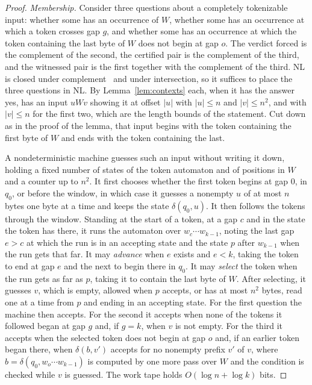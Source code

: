 \documentclass[11pt,a4paper]{article}
\theoremstyle{definition}
\theoremstyle{plain}
\begin{document}
\begin{proof}
\emph{Membership.} Consider three questions about a completely tokenizable input: whether some has an occurrence of $W$,
whether some has an occurrence at which a token crosses gap $g$, and whether some has an occurrence at which the token
containing the last byte of $W$ does not begin at gap $o$. The verdict forced is the complement of the second, the
certified pair is the complement of the third, and the witnessed pair is the first together with the complement of the
third. NL is closed under complement~\cite{immerman1988nondeterministic,szelepcsenyi1988method} and under intersection,
so it suffices to place the three questions in NL. By Lemma~\ref{lem:contexts} each, when it has the answer yes, has an
input $u W v$ showing it at offset $|u|$ with $|u| \leq n$ and $|v| \leq n^2$, and with $|v| \leq n$ for the first two,
which are the length bounds of the statement. Cut down as in the proof of the lemma, that input begins with the token
containing the first byte of $W$ and ends with the token containing the last.

A nondeterministic machine guesses such an input without writing it down, holding a fixed number of states of the token
automaton and of positions in $W$ and a counter up to $n^2$. It first chooses whether the first token begins at gap $0$,
in $q_0$, or before the window, in which case it guesses a nonempty $u$ of at most $n$ bytes one byte at a time and
keeps the state $\delta(q_0, u)$. It then follows the tokens through the window. Standing at the start of a token, at a
gap $c$ and in the state the token has there, it runs the automaton over $w_c \cdots w_{k-1}$, noting the last gap
$e > c$ at which the run is in an accepting state and the state $p$ after $w_{k-1}$ when the run gets that far. It may
\emph{advance} when $e$ exists and $e < k$, taking the token to end at gap $e$ and the next to begin there in $q_0$. It
may \emph{select} the token when the run gets as far as $p$, taking it to contain the last byte of $W$. After selecting,
it guesses $v$, which is empty, allowed when $p$ accepts, or has at most $n^2$ bytes, read one at a time from $p$ and
ending in an accepting state. For the first question the machine then accepts. For the second it accepts when none of
the tokens it followed began at gap $g$ and, if $g = k$, when $v$ is not empty. For the third it accepts when the
selected token does not begin at gap $o$ and, if an earlier token began there, when $\delta(b, v')$ accepts for no
nonempty prefix $v'$ of $v$, where $b = \delta(q_0, w_o \cdots w_{k-1})$ is computed by one more pass over $W$ and the
condition is checked while $v$ is guessed. The work tape holds $O(\log n + \log k)$ bits.


\end{proof}
\end{document}
